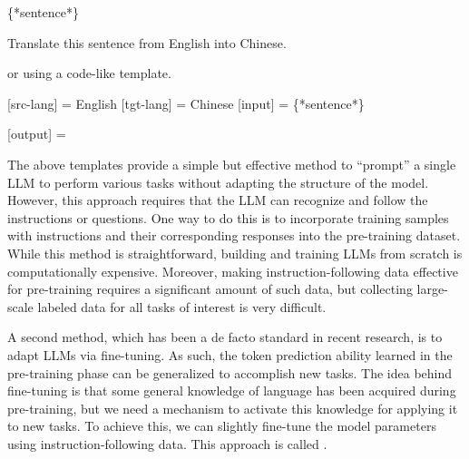 \vspace{0.5em}
\begin{tcolorbox}
\hspace{4em} \{*sentence*\}

\hspace{4em} Translate this sentence from English into Chinese.

\hspace{4em} \underline{\hspace{2em}}
\end{tcolorbox}
\vspace{0.5em}

\noindent or using a code-like template.

\vspace{0.5em}
\begin{tcolorbox}
\hspace{4em} [src-lang] = English [tgt-lang] = Chinese [input] = \{*sentence*\}

\hspace{4em} [output] = \underline{\hspace{2em}}
\end{tcolorbox}
\vspace{0.5em}

The above templates provide a simple but effective method to ``prompt'' a single LLM to perform various tasks without adapting the structure of the model. However, this approach requires that the LLM can recognize and follow the instructions or questions. One way to do this is to incorporate training samples with instructions and their corresponding responses into the pre-training dataset. While this method is straightforward, building and training LLMs from scratch is computationally expensive. Moreover, making instruction-following data effective for pre-training requires a significant amount of such data, but collecting large-scale labeled data for all tasks of interest is very difficult.

A second method, which has been a de facto standard in recent research, is to adapt LLMs via fine-tuning. As such, the token prediction ability learned in the pre-training phase can be generalized to accomplish new tasks. The idea behind fine-tuning is that some general knowledge of language has been acquired during pre-training, but we need a mechanism to activate this knowledge for applying it to new tasks. To achieve this, we can slightly fine-tune the model parameters using instruction-following data. This approach is called .

